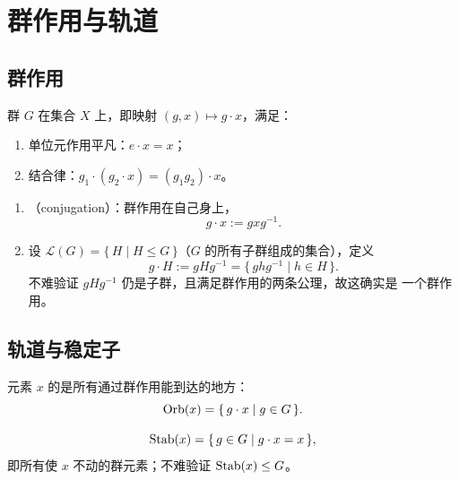 \section{群作用与轨道}\label{sec:actions}

\subsection{群作用}

\begin{definition}
群 $G$ 在集合 $X$ 上，即映射 $(g,x)\mapsto g\cdot x$，满足：
\begin{enumerate}[leftmargin=1.6em,itemsep=1pt]
  \item 单位元作用平凡：$e\cdot x = x$；
  \item 结合律：$g_1\cdot(g_2\cdot x) = (g_1 g_2)\cdot x$。
\end{enumerate}
\end{definition}

\begin{example}[共轭作用]
\leavevmode
\begin{enumerate}[leftmargin=1.6em,itemsep=2pt]
  \item {}（conjugation）：群作用在自己身上，
        \[
          g\cdot x := gxg^{-1}.
        \]
  \item {}设
        $\mathcal{L}(G) = \{\,H \mid H\le G\,\}$（$G$ 的所有子群组成的集合），定义
        \[
          g\cdot H := gHg^{-1} = \{\,ghg^{-1} \mid h\in H\,\}.
        \]
        不难验证 $gHg^{-1}$ 仍是子群，且满足群作用的两条公理，故这确实是
        一个群作用。
\end{enumerate}
\end{example}

\subsection{轨道与稳定子}

\begin{definition}[轨道（Orbit）]
元素 $x$ 的是所有通过群作用能到达的地方：
\[
  \mathrm{Orb}(x) = \{\,g\cdot x \mid g\in G\,\}.
\]
\end{definition}

\begin{definition}
\[
  \mathrm{Stab}(x) = \{\,g\in G \mid g\cdot x = x\,\},
\]
即所有使 $x$ 不动的群元素；不难验证 $\mathrm{Stab}(x)\le G$。
\end{definition}

